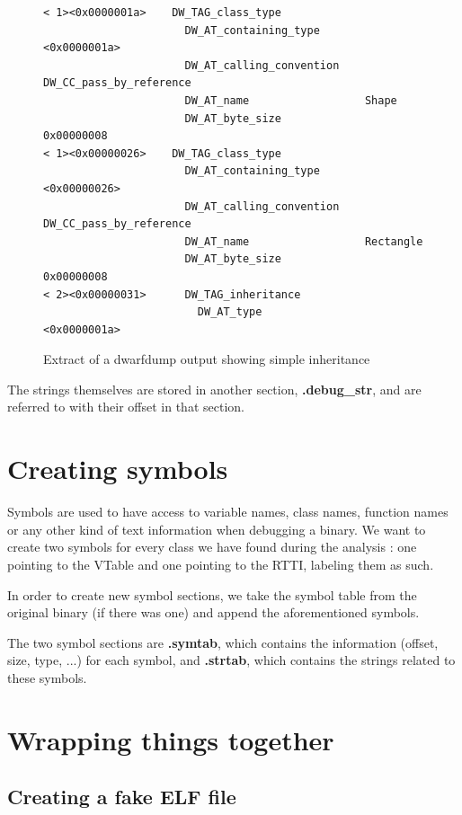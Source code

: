 \documentclass[a4paper,11pt,oneside]{report}
\begin{document}
\begin{figure}[h]
\begin{lstlisting}
< 1><0x0000001a>    DW_TAG_class_type
                      DW_AT_containing_type       <0x0000001a>
                      DW_AT_calling_convention    DW_CC_pass_by_reference
                      DW_AT_name                  Shape
                      DW_AT_byte_size             0x00000008
< 1><0x00000026>    DW_TAG_class_type
                      DW_AT_containing_type       <0x00000026>
                      DW_AT_calling_convention    DW_CC_pass_by_reference
                      DW_AT_name                  Rectangle
                      DW_AT_byte_size             0x00000008
< 2><0x00000031>      DW_TAG_inheritance
                        DW_AT_type                  <0x0000001a>
\end{lstlisting}
\caption{Extract of a dwarfdump output showing simple inheritance}
\label{dwarfdump}
\end{figure}

The strings themselves are stored in another section, \textbf{.debug\_str}, and are referred to with their offset in that section.

\section{Creating symbols}

Symbols are used to have access to variable names, class names, function names or any other kind of text information when debugging a binary.
We want to create two symbols for every class we have found during the analysis : one pointing to the VTable and one pointing to the RTTI, labeling them as such.

In order to create new symbol sections, we take the symbol table from the original binary (if there was one) and append the aforementioned symbols.

The two symbol sections are \textbf{.symtab}, which contains the information (offset, size, type, ...) for each symbol, and \textbf{.strtab}, which contains the strings related to these symbols.

\section{Wrapping things together}

\subsection{Creating a fake ELF file}
\end{document}

